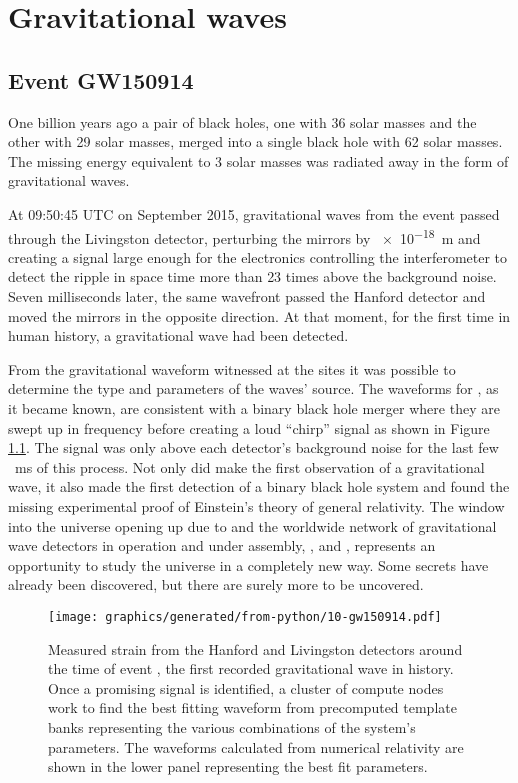 \chapter{\label{c:gw-detection}Gravitational waves}

\section{Event GW150914}
One billion years ago a pair of black holes, one with \num{36} solar masses and the other with \num{29} solar masses, merged into a single black hole with \num{62} solar masses. The missing energy equivalent to \num{3} solar masses was radiated away in the form of gravitational waves.

At 09:50:45 \gls{UTC} on  September 2015, gravitational waves from the event passed through the \LIGO{} Livingston detector, perturbing the mirrors by \SI{e-18}{\meter} and creating a signal large enough for the electronics controlling the interferometer to detect the ripple in space time more than \num{23} times above the background noise. Seven milliseconds later, the same wavefront passed the \LIGO{} Hanford detector and moved the mirrors in the opposite direction. At that moment, for the first time in human history, a gravitational wave had been detected.

From the gravitational waveform witnessed at the \LIGO{} sites it was possible to determine the type and parameters of the waves' source. The waveforms for \emph{\GWFIRSTEVENT{}}, as it became known, are consistent with a binary black hole merger where they are swept up in frequency before creating a loud ``chirp'' signal as shown in Figure\,\ref{fig:gw150914}. The signal was only above each detector's background noise for the last few \SI{}{\milli\second} of this process. Not only did \LIGO{} make the first observation of a gravitational wave, it also made the first detection of a binary black hole system and found the missing experimental proof of Einstein's theory of general relativity. The window into the universe opening up due to \LIGO{} and the worldwide network of gravitational wave detectors in operation and under assembly, \GEO{}, \VIRGO{} and \KAGRA{}, represents an opportunity to study the universe in a completely new way. Some secrets have already been discovered, but there are surely more to be uncovered.

\begin{figure}
  \centering
  \texttt{[image: graphics/generated/from-python/10-gw150914.pdf]}
  \caption[Measured strain from the LIGO Hanford and Livingston detectors around the time of event \GWFIRSTEVENT{}]{\label{fig:gw150914}Measured strain from the \LIGO{} Hanford and Livingston detectors around the time of event \GWFIRSTEVENT{}, the first recorded gravitational wave in history. Once a promising signal is identified, a cluster of compute nodes work to find the best fitting waveform from precomputed template banks representing the various combinations of the system's parameters. The waveforms calculated from numerical relativity are shown in the lower panel representing the best fit parameters.}
\end{figure}

